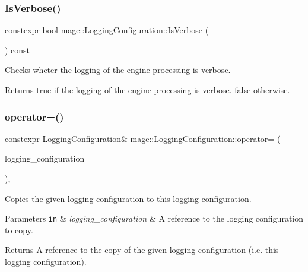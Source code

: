 \subsubsection{\texorpdfstring{Is\+Verbose()}{IsVerbose()}}
{\footnotesize\ttfamily constexpr bool mage\+::\+Logging\+Configuration\+::\+Is\+Verbose (\begin{DoxyParamCaption}{ }\end{DoxyParamCaption}) const\hspace{0.3cm}{\ttfamily [noexcept]}}

Checks wheter the logging of the engine processing is verbose.

\begin{DoxyReturn}{Returns}
{\ttfamily true} if the logging of the engine processing is verbose. {\ttfamily false} otherwise. 
\end{DoxyReturn}
\hypertarget{classmage_1_1_logging_configuration_a159b4a7b20a34f1b08f4344a77689b13}{}\label{classmage_1_1_logging_configuration_a159b4a7b20a34f1b08f4344a77689b13} 
\subsubsection{\texorpdfstring{operator=()}{operator=()}\hspace{0.1cm}{\footnotesize\ttfamily [1/2]}}
{\footnotesize\ttfamily constexpr \hyperlink{classmage_1_1_logging_configuration}{Logging\+Configuration}\& mage\+::\+Logging\+Configuration\+::operator= (\begin{DoxyParamCaption}\item[{const \hyperlink{classmage_1_1_logging_configuration}{Logging\+Configuration} \&}]{logging\+\_\+configuration }\end{DoxyParamCaption})\hspace{0.3cm}{\ttfamily [default]}, {\ttfamily [noexcept]}}

Copies the given logging configuration to this logging configuration.


\begin{DoxyParams}[1]{Parameters}
\mbox{\tt in}  & {\em logging\+\_\+configuration} & A reference to the logging configuration to copy. \\
\hline
\end{DoxyParams}
\begin{DoxyReturn}{Returns}
A reference to the copy of the given logging configuration (i.\+e. this logging configuration). 
\end{DoxyReturn}
\hypertarget{classmage_1_1_logging_configuration_adf70888b290b3b160c37c350e891900e}{}\label{classmage_1_1_logging_configuration_adf70888b290b3b160c37c350e891900e} 
